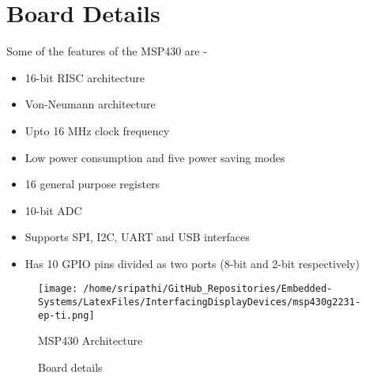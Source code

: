 \documentclass[12pt, letterpaper]{article}
\begin{document}
\section{Board Details}

Some of the features of the MSP430 are -

\begin{itemize}
	\item 16-bit RISC architecture
	\item Von-Neumann architecture
	\item Upto 16 MHz clock frequency
	\item Low power consumption and five power saving modes
	\item 16 general purpose registers
	\item 10-bit ADC
	\item Supports SPI, I2C, UART and USB interfaces
	\item Has 10 GPIO pins divided as two ports (8-bit and 2-bit respectively)
\end{itemize}
	
\begin{figure}[t]
	\centering
	\texttt{[image: /home/sripathi/GitHub\_Repositories/Embedded-Systems/LatexFiles/InterfacingDisplayDevices/msp430g2231-ep-ti.png]}
	\caption{MSP430 Architecture}
	\label{fig:architecture}
\end{figure}

\begin{figure}[t]
	\centering
		\caption{Board details}
		\label{fig:board}
\end{figure}

	
\end{document}

